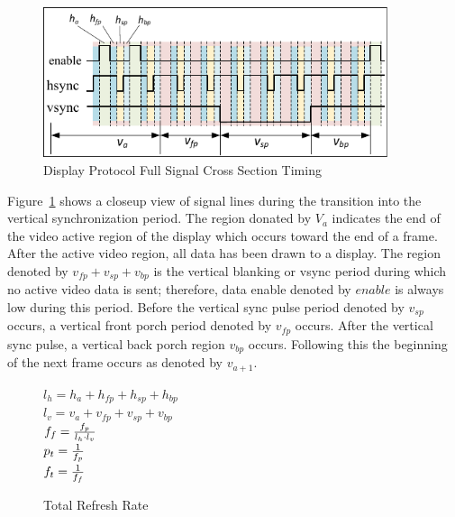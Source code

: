 
    \begin{figure}
        \centering
        \includegraphics[width=0.9\textwidth]{fig/display_timing_full_cross.pdf}
        \caption{Display Protocol Full Signal Cross Section Timing}
        \label{fig:display_protocol_full_cross}
    \end{figure}

    Figure~\ref{fig:display_protocol_full_cross} shows a closeup view of signal lines during the transition into the vertical synchronization period. The region donated by $V_a$ indicates the end of the video active region of the display which occurs toward the end of a frame. After the active video region, all data has been drawn to a display. The region denoted by $v_{fp}+v_{sp}+v_{bp}$ is the vertical blanking or vsync period during which no active video data is sent; therefore, data enable denoted by $enable$ is always low during this period. Before the vertical sync pulse period denoted by $v_{sp}$ occurs, a vertical front porch period denoted by $v_{fp}$ occurs. After the vertical sync pulse, a vertical back porch region $v_{bp}$ occurs. Following this the beginning of the next frame occurs as denoted by $v_{a+1}$.
    \begin{figure}
        \centering
        { \Large
            $l_h=h_a+h_{fp}+h_{sp}+h_{bp}$ \vspace{8px} \\
            $l_v=v_a+v_{fp}+v_{sp}+v_{bp}$ \vspace{8px} \\
            $f_f={f_p \over {l_h \cdot l_v}}$ \\
            $p_t={1 \over f_p}$ \vspace{8px} \\
            $f_t={1 \over f_f}$ \vspace{8px}
        }
        \caption{Total Refresh Rate}
        \label{fig:modeline_refresh_rate}
    \end{figure}

